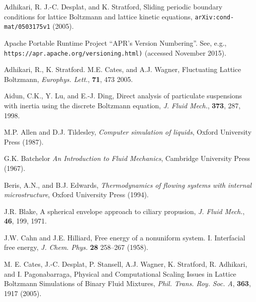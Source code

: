 %
%
%
%
%
%

\vfill
\pagebreak



\begin{thebibliography}{99}


Adhikari, R. J.-C. Desplat, and K. Stratford,
Sliding periodic boundary conditions for lattice Boltzmann and lattice
kinetic equations,
\texttt{arXiv:cond-mat/0503175v1} (2005).

Apache Portable Runtime Project ``APR's Version Numbering''.
See, e.g., \texttt{https://apr.apache.org/versioning.html)}
(accessed November 2015).

Adhikari, R., K. Stratford. M.E. Cates, and A.J. Wagner,
Fluctuating Lattice Boltzmann,
\textit{Europhys. Lett.}, \textbf{71}, 473 2005.

Aidun, C.K., Y. Lu, and E.-J. Ding,
Direct analysis of particulate suspensions with inertia using the
discrete Boltzmann equation,
\textit{J. Fluid Mech.}, \textbf{373}, 287, 1998.

M.P. Allen and D.J. Tildesley,
\textit{Computer simulation of liquids},
Oxford University Press (1987).

G.K. Batchelor
\textit{An Introduction to Fluid Mechanics},
Cambridge University Press (1967).

Beris, A.N., and B.J. Edwards,
\textit{Thermodynamics of flowing systems with internal microstructure},
Oxford University Press (1994).

J.R. Blake, A spherical envelope approach to ciliary propusion,
\textit{J. Fluid Mech.}, \textbf{46}, 199, 1971.

J.W. Cahn and J.E. Hilliard,
Free energy of a nonuniform system. I. Interfacial free energy,
\textit{J. Chem. Phys.} \textbf{28} 258--267 (1958).

M. E. Cates, J.-C. Desplat, P. Stansell, A.J. Wagner, K. Stratford,
R. Adhikari, and I. Pagonabarraga,
Physical and Computational Scaling Issues in Lattice Boltzmann
Simulations of Binary Fluid Mixtures,
\textit{Phil. Trans. Roy. Soc. A}, \textbf{363}, 1917 (2005). 


\end{thebibliography}
